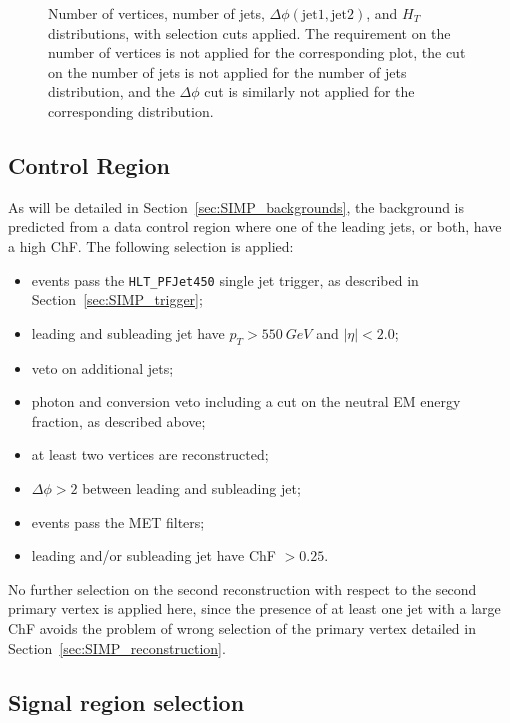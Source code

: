 \begin{figure}[h]
  \caption{Number of vertices, number of jets, $\Delta\phi (\mathrm{jet}1, \mathrm{jet}2)$, and $H_{T}$ distributions, with selection cuts applied. The requirement on the number of vertices is not applied for the corresponding plot, the cut on the number of jets is not applied for the number of jets distribution, and the $\Delta\phi$ cut is similarly not applied for the corresponding distribution.}
  \label{fig:event_selection_2}
\end{figure}


\subsection{Control Region}

As will be detailed in Section~\ref{sec:SIMP_backgrounds}, the background is predicted from a data control region where one of the leading jets, or both, have a high ChF. The following selection is applied:

\begin{itemize}
 \item events pass the \texttt{HLT\_PFJet450} single jet trigger, as described in Section~\ref{sec:SIMP_trigger};
 \item leading and subleading jet have $p_T > \SI{550}{GeV}$ and $|\eta| < 2.0$;
 \item veto on additional jets;
 \item photon and conversion veto including a cut on the neutral EM energy fraction, as described above;
 \item at least two vertices are reconstructed;
 \item $\Delta\phi > 2$ between leading and subleading jet;
 \item events pass the MET filters;
 \item leading and/or subleading jet have ChF $> 0.25$.
\end{itemize}

No further selection on the second reconstruction with respect to the second primary vertex is applied here, since the presence of at least one jet with a large ChF avoids the problem of wrong selection of the primary vertex detailed in Section~\ref{sec:SIMP_reconstruction}.

\subsection{Signal region selection}


